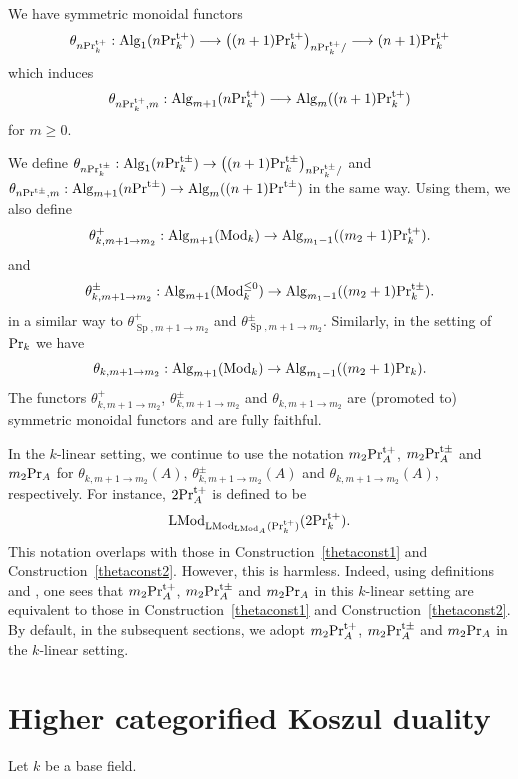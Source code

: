 \documentclass[leqno,12pt]{amsart}
\theoremstyle{plain}
\theoremstyle{definition}
\newcommand{\PR}{\textup{Pr}}
\newcommand{\PRTT}{\textup{Pr}^{\textup{t}+}}
\newcommand{\PRTTT}{\textup{Pr}^{\textup{t}\pm}}
\newcommand{\SP}{\operatorname{Sp}}
\newcommand{\Mod}{\operatorname{Mod}}
\newcommand{\Alg}{\operatorname{Alg}}
\newcommand{\LMod}{\operatorname{LMod}}
\begin{document}
We have symmetric monoidal functors
\[
\theta_{n\PRTT_k}:\Alg_1(n\PRTT_k) \longrightarrow \big{(}(n+1)\PRTT_k\big{)}_{n\PRTT_k/}\longrightarrow (n+1)\PRTT_k
\]
which induces
\[
\theta_{n\PRTT_k,m}:\Alg_{m+1}(n\PRTT_k) \longrightarrow \Alg_{m}((n+1)\PRTT_k)
\]
for $m\ge0$.

We define $\theta_{n\PRTTT_k}:\Alg_1(n\PRTTT_k) \rightarrow \big{(}(n+1)\PRTTT_k\big{)}_{n\PRTTT_k/}$
and $\theta_{n\PRTTT,m}:\Alg_{m+1}(n\PRTTT) \rightarrow \Alg_{m}((n+1)\PRTTT)$
in the same way.
Using them, we also define
\[
\theta_{k,m+1\to m_2}^+:\Alg_{m+1}(\Mod_k)\to \Alg_{m_1-1}((m_2+1)\PRTT_k).
\]
and 
\[
\theta_{k,m+1\to m_2}^\pm:\Alg_{m+1}(\Mod_k^{\le0})\to \Alg_{m_1-1}((m_2+1)\PRTTT_k).
\]
in a similar way to $\theta^+_{\SP,m+1\to m_2}$
and $\theta^\pm_{\SP,m+1\to m_2}$.
Similarly, in the setting of $\PR_k$ we have
\[
\theta_{k,m+1\to m_2}:\Alg_{m+1}(\Mod_k)\to \Alg_{m_1-1}((m_2+1)\PR_k).
\]
The functors $\theta_{k,m+1\to m_2}^+$, $\theta_{k,m+1\to m_2}^\pm$ and $\theta_{k,m+1\to m_2}$
are (promoted to) symmetric monoidal functors and are fully faithful.

In the $k$-linear setting, we continue to use the notation $m_2\PRTT_A$, $m_2\PRTTT_A$ and $m_2\PR_A$ 
for $\theta_{k,m+1\to m_2}(A)$, $\theta_{k,m+1\to m_2}^\pm(A)$ and $\theta_{k,m+1\to m_2}(A)$, respectively.
For instance, $2\PRTT_A$ is defined to be 
\[
\LMod_{\LMod_{\LMod_A}(\PRTT_k)}(2\PRTT_k).
\]
This notation overlaps with those in Construction~\ref{thetaconst1} and Construction~\ref{thetaconst2}.
However, this is harmless. Indeed, using definitions and \cite[7.1.3.1]{HA},
one sees that $m_2\PRTT_A$, $m_2\PRTTT_A$ and $m_2\PR_A$ in this $k$-linear setting
are equivalent to those in Construction~\ref{thetaconst1} and Construction~\ref{thetaconst2}.
By default, in the subsequent sections, we adopt $m_2\PRTT_A$, $m_2\PRTTT_A$ and $m_2\PR_A$ in the $k$-linear setting.









\section{Higher categorified Koszul duality}



\label{HCKDsec}


Let $k$ be a base field.
\end{document}
